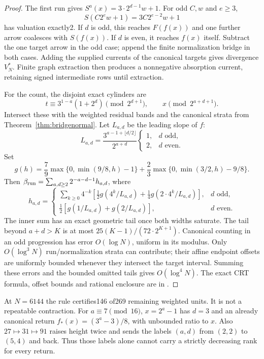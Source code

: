 \documentclass[11pt]{article}
\begin{document}
\begin{proof}
The first run gives $S^a(x)=3\cdot2^{d-1}w+1$.
For odd $C,w$ and $e\ge3$,
\[
S(C2^ew+1)=3C2^{e-2}w+1
\]
has valuation exactly2. If $d$ is odd, this reaches $F(f(x))$ and
one further arrow coalesces with $S(f(x))$. If $d$ is even, it reaches
$f(x)$ itself. Subtract the one target arrow in the odd case; append
the finite normalization bridge in both cases. Adding the supplied
currents of the canonical targets gives divergence $V^*_N$.
Finite graph extraction then produces a nonnegative absorption current,
retaining signed intermediate rows until extraction.

For the count, the disjoint exact cylinders are
\[
t\equiv3^{1-a}(1+2^d)\pmod{2^{d+1}},\qquad
x\pmod{2^{a+d+1}}.
\]
Intersect these with the weighted residual bands and the canonical
strata from Theorem~\ref{thm:bridgenormal}. Let $L_{a,d}$ be the
leading slope of $f$:
\[
L_{a,d}=\frac{3^{a-1+\lfloor d/2\rfloor}}{2^{a+d}}
\begin{cases}1,&d\text{ odd},\\2,&d\text{ even}.
\end{cases}
\]
Set
\[
g(h)=\frac79\max\{0,\min(9/8,h)-1\}
+\frac23\max\{0,\min(3/2,h)-9/8\}.
\]
Then $\beta_{\rm run}=\sum_{a,d\ge2}2^{-a-d-1}h_{a,d}$, where
\[
h_{a,d}=\begin{cases}
\displaystyle\sum_{k\ge0}4^{-k}
 \left[\tfrac12g(4^k/L_{a,d})+\tfrac14g(2\cdot4^k/L_{a,d})\right],
 &d\text{ odd},\\
\tfrac12[g(1/L_{a,d})+g(2/L_{a,d})],&d\text{ even}.
\end{cases}
\]
The inner sum has an exact geometric tail once both widths saturate.
The tail beyond $a+d>K$ is at most $25(K-1)/(72\cdot2^{K+1})$.
Canonical counting in an odd progression has error $O(\log N)$,
uniform in its modulus. Only $O(\log^3N)$ run/normalization strata
can contribute; their affine endpoint offsets are uniformly bounded
whenever they intersect the target interval. Summing these errors and
the bounded omitted tails gives $O(\log^4N)$. The exact CRT formula,
offset bounds and rational enclosure are in
.
\end{proof}
At $N=6144$ the rule certifies146 of269 remaining weighted units.
It is not a repeatable contraction. For $a\equiv7\pmod{16}$,
$x=2^a-1$ has $d=3$ and an already canonical return
$f_*(x)=(3^a-3)/8$, with unbounded ratio to $x$.
Also $27\mapsto31\mapsto91$ raises height twice and sends the labels
$(a,d)$ from $(2,2)$ to $(5,4)$ and back. Thus those labels alone
cannot carry a strictly decreasing rank for every return.
\end{document}
